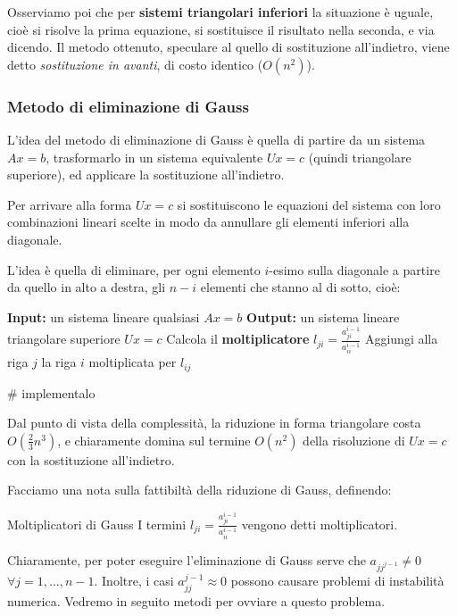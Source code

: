 \documentclass[a4paper,11pt]{article}
\begin{document}
Osserviamo poi che per \textbf{sistemi triangolari inferiori} la situazione è uguale, cioè si risolve la prima equazione, si sostituisce il risultato nella seconda, e via dicendo.
Il metodo ottenuto, speculare al quello di sostituzione all'indietro, viene detto \textit{sostituzione in avanti}, di costo identico ($O(n^2)$).

\subsubsection{Metodo di eliminazione di Gauss}
L'idea del metodo di eliminazione di Gauss è quella di partire da un sistema $Ax = b$, trasformarlo in un sistema equivalente $Ux = c$ (quindi triangolare superiore), ed applicare la sostituzione all'indietro.

Per arrivare alla forma $Ux = c$ si sostituiscono le equazioni del sistema con loro combinazioni lineari scelte in modo da annullare gli elementi inferiori alla diagonale.

L'idea è quella di eliminare, per ogni elemento $i$-esimo sulla diagonale a partire da quello in alto a destra, gli $n - i$ elementi che stanno al di sotto, cioè:

\begin{algorithm}
\caption{Eliminazione di Gauss}
\begin{algorithmic}
	\STATE \textbf{Input:} un sistema lineare qualsiasi $Ax = b$ %
	\STATE \textbf{Output:} un sistema lineare triangolare superiore $Ux = c$ %
			\STATE Calcola il \textbf{moltiplicatore} $l_{ji} = \frac{a_{ji}^{i - 1}}{a_{ii}^{i - 1}}$
			\STATE Aggiungi alla riga $j$ la riga $i$ moltiplicata per $l_{ij}$
		\ENDFOR
	\ENDFOR
\end{algorithmic}
\end{algorithm}

# implementalo

Dal punto di vista della complessità, la riduzione in forma triangolare costa $O(\frac{2}{3}n^3)$, e chiaramente domina sul termine $O(n^2)$ della risoluzione di $Ux = c$ con la sostituzione all'indietro.

Facciamo una nota sulla fattibiltà della riduzione di Gauss, definendo:
\begin{definition}{Moltiplicatori di Gauss}
	I termini $l_{ji} = \frac{a_{ji}^{i - 1}}{a_{ii}^{i - 1}}$ vengono detti moltiplicatori.
\end{definition}
Chiaramente, per poter eseguire l'eliminazione di Gauss serve che $a_{jj^{j - 1}} \neq 0$ $\forall j = 1, ..., n - 1$.
Inoltre, i casi $a_{jj}^{j - 1} \approx 0$ possono causare problemi di instabilità numerica.
Vedremo in seguito metodi per ovviare a questo problema.
\end{document}
